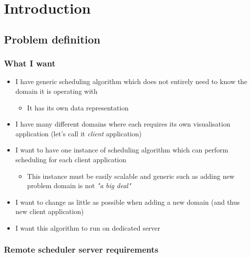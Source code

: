 
\chapter{Introduction}\label{ch:introduction}

\section{Problem definition}\label{sec:problem-definition}

\subsection{What I want}\label{subsec:what-i-want}

\begin{itemize}
    \item I have generic scheduling algorithm which does not entirely need to know the domain it is operating with
    \begin{itemize}
        \item It has its own data representation
    \end{itemize}
    \item I have many different domains where each requires its own visualisation application (let's call it \textit{client} application)
    \item I want to have one instance of scheduling algorithm which can perform scheduling for each client application
    \begin{itemize}
        \item This instance must be easily scalable and generic such as adding new problem domain is not \textit{"a big deal"}
    \end{itemize}
    \item I want to change as little as possible when adding a new domain (and thus new client application)
    \item I want this algorithm to run on dedicated server
\end{itemize}

\subsection{Remote scheduler server requirements}\label{subsec:remote-scheduler-server-requirements}

